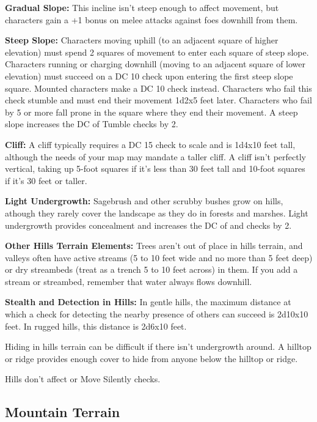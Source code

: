 \textbf{Gradual Slope:} This incline isn't steep enough to affect movement, but 
characters gain a +1 bonus on melee attacks against foes downhill from them.

\textbf{Steep Slope:} Characters moving uphill (to an adjacent square of higher 
elevation) must spend 2 squares of movement to enter each square of steep slope. 
Characters running or charging downhill (moving to an adjacent square of lower 
elevation) must succeed on a DC 10  check upon entering the first steep 
slope square. Mounted characters make a DC 10  check instead. Characters who 
fail this check stumble and must end their movement 1d2x5 feet 
later. Characters who fail by 5 or more fall prone in the square where they end 
their movement. A steep slope increases the DC of Tumble checks by 2.

\textbf{Cliff:} A cliff typically requires a DC 15  check to scale and is 
1d4x10 feet tall, although the needs of your map may mandate 
a taller cliff. A cliff isn't perfectly vertical, taking up 5-foot squares if it's 
less than 30 feet tall and 10-foot squares if it's 30 feet or taller. 

\textbf{Light Undergrowth:} Sagebrush and other scrubby bushes grow on hills, athough 
they rarely cover the landscape as they do in forests and marshes. Light undergrowth 
provides concealment and increases the DC of  and  checks by 
2. 

\textbf{Other Hills Terrain Elements:} Trees aren't out of place in hills terrain, 
and valleys often have active streams (5 to 10 feet wide and no more than 5 feet 
deep) or dry streambeds (treat as a trench 5 to 10 feet across) in them. If you 
add a stream or streambed, remember that water always flows downhill.

\textbf{Stealth and Detection in Hills:} In gentle hills, the maximum distance 
at which a  check for detecting the nearby presence of others can succeed is 
2d10x10 feet. In rugged hills, this distance is 2d6x10 
feet.

Hiding in hills terrain can be difficult if there isn't undergrowth around. A hilltop 
or ridge provides enough cover to hide from anyone below the hilltop or ridge.

Hills don't affect  or Move Silently checks. 

\subsection{Mountain Terrain}

